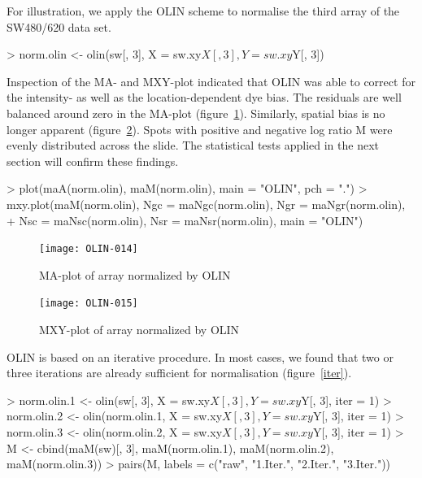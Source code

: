 \documentclass[a4paper,11pt]{article}
\begin{document}
For illustration, we apply the OLIN scheme to normalise the third array of the SW480/620 data set. 
\begin{Schunk}
\begin{Sinput}
> norm.olin <- olin(sw[, 3], X = sw.xy$X[, 3], Y = sw.xy$Y[, 3])
\end{Sinput}
\end{Schunk}

Inspection of the MA- and MXY-plot indicated that OLIN  was able to correct for the  
intensity- as well as  the  location-dependent dye bias. The
 residuals are well  balanced around zero in the MA-plot (figure~\ref{maolin}).
Similarly, spatial bias is no longer apparent (figure~\ref{mxyolin}).
Spots with positive and negative log ratio M were evenly distributed across the slide. 
The statistical tests
applied in the next section will confirm  these findings. 

\begin{Schunk}
\begin{Sinput}
> plot(maA(norm.olin), maM(norm.olin), main = "OLIN", pch = ".")
> mxy.plot(maM(norm.olin), Ngc = maNgc(norm.olin), Ngr = maNgr(norm.olin), 
+   Nsc = maNsc(norm.olin), Nsr = maNsr(norm.olin), main = "OLIN")
\end{Sinput}
\end{Schunk}



\begin{figure}[t]
\centering
\texttt{[image: OLIN-014]}
\caption{MA-plot of array normalized by  OLIN }
\label{maolin}
\end{figure}



\begin{figure}
\centering
\texttt{[image: OLIN-015]}
\caption{MXY-plot of array normalized by  OLIN }
\label{mxyolin}
\end{figure}


OLIN is based on an iterative procedure. In most cases, we found
that two or three iterations are already sufficient for normalisation (figure~\ref{iter}).   


\begin{Schunk}
\begin{Sinput}
> norm.olin.1 <- olin(sw[, 3], X = sw.xy$X[, 3], Y = sw.xy$Y[, 3], iter = 1)
> norm.olin.2 <- olin(norm.olin.1, X = sw.xy$X[, 3], Y = sw.xy$Y[, 3], iter = 1)
> norm.olin.3 <- olin(norm.olin.2, X = sw.xy$X[, 3], Y = sw.xy$Y[, 3], iter = 1)
> M <- cbind(maM(sw)[, 3], maM(norm.olin.1), maM(norm.olin.2), maM(norm.olin.3))
> pairs(M, labels = c("raw", "1.Iter.", "2.Iter.", "3.Iter."))
\end{Sinput}
\end{Schunk}
\end{document}
